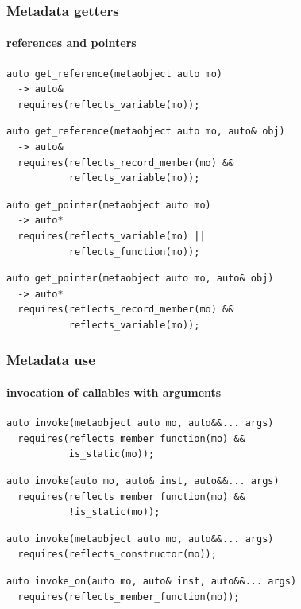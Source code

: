 \documentclass[compress,table,xcolor=table]{beamer}
\begin{document}
\begin{frame}[fragile]
  \frametitle{Metadata getters}
  \framesubtitle{references and pointers}
  \begin{lstlisting}[language=c++2x,basicstyle=\footnotesize\ttfamily]
auto get_reference(metaobject auto mo)
  -> auto&
  requires(reflects_variable(mo));
  \end{lstlisting}
  \vfill
  \begin{lstlisting}[language=c++2x,basicstyle=\footnotesize\ttfamily]
auto get_reference(metaobject auto mo, auto& obj)
  -> auto&
  requires(reflects_record_member(mo) &&
           reflects_variable(mo));
  \end{lstlisting}
  \vfill
  \begin{lstlisting}[language=c++2x,basicstyle=\footnotesize\ttfamily]
auto get_pointer(metaobject auto mo)
  -> auto*
  requires(reflects_variable(mo) ||
           reflects_function(mo));
  \end{lstlisting}
  \vfill
  \begin{lstlisting}[language=c++2x,basicstyle=\footnotesize\ttfamily]
auto get_pointer(metaobject auto mo, auto& obj)
  -> auto*
  requires(reflects_record_member(mo) &&
           reflects_variable(mo));
  \end{lstlisting}
\end{frame}
\begin{frame}[fragile]
  \frametitle{Metadata use}
  \framesubtitle{invocation of callables with arguments}
  \begin{lstlisting}[language=c++2x,basicstyle=\footnotesize\ttfamily]
auto invoke(metaobject auto mo, auto&&... args)
  requires(reflects_member_function(mo) &&
           is_static(mo));
  \end{lstlisting}
  \vfill
  \begin{lstlisting}[language=c++2x,basicstyle=\footnotesize\ttfamily]
auto invoke(auto mo, auto& inst, auto&&... args)
  requires(reflects_member_function(mo) &&
           !is_static(mo));
  \end{lstlisting}
  \vfill
  \begin{lstlisting}[language=c++2x,basicstyle=\footnotesize\ttfamily]
auto invoke(metaobject auto mo, auto&&... args)
  requires(reflects_constructor(mo));
  \end{lstlisting}
  \vfill
  \begin{lstlisting}[language=c++2x,basicstyle=\footnotesize\ttfamily]
auto invoke_on(auto mo, auto& inst, auto&&... args)
  requires(reflects_member_function(mo));
  \end{lstlisting}
\end{frame}
\end{document}
